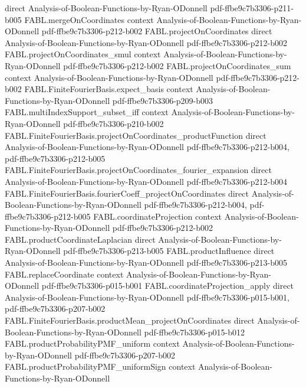 \begin{theorem}
  {direct}
  {Analysis-of-Boolean-Functions-by-Ryan-ODonnell}
  {pdf-ffbe9c7b3306-p211-b005}
\proofstep
  {FABL.mergeOnCoordinates}
  {context}
  {Analysis-of-Boolean-Functions-by-Ryan-ODonnell}
  {pdf-ffbe9c7b3306-p212-b002}
\proofstep
  {FABL.projectOnCoordinates}
  {direct}
  {Analysis-of-Boolean-Functions-by-Ryan-ODonnell}
  {pdf-ffbe9c7b3306-p212-b002}
\proofstep
  {FABL.projectOnCoordinates_smul}
  {context}
  {Analysis-of-Boolean-Functions-by-Ryan-ODonnell}
  {pdf-ffbe9c7b3306-p212-b002}
\proofstep
  {FABL.projectOnCoordinates_sum}
  {context}
  {Analysis-of-Boolean-Functions-by-Ryan-ODonnell}
  {pdf-ffbe9c7b3306-p212-b002}
\proofstep
  {FABL.FiniteFourierBasis.expect_basis}
  {context}
  {Analysis-of-Boolean-Functions-by-Ryan-ODonnell}
  {pdf-ffbe9c7b3306-p209-b003}
\proofstep
  {FABL.multiIndexSupport_subset_iff}
  {context}
  {Analysis-of-Boolean-Functions-by-Ryan-ODonnell}
  {pdf-ffbe9c7b3306-p210-b002}
\proofstep
  {FABL.FiniteFourierBasis.projectOnCoordinates_productFunction}
  {direct}
  {Analysis-of-Boolean-Functions-by-Ryan-ODonnell}
  {pdf-ffbe9c7b3306-p212-b004,
    pdf-ffbe9c7b3306-p212-b005}
\proofstep
  {FABL.FiniteFourierBasis.projectOnCoordinates_fourier_expansion}
  {direct}
  {Analysis-of-Boolean-Functions-by-Ryan-ODonnell}
  {pdf-ffbe9c7b3306-p212-b004}
\proofstep
  {FABL.FiniteFourierBasis.fourierCoeff_projectOnCoordinates}
  {direct}
  {Analysis-of-Boolean-Functions-by-Ryan-ODonnell}
  {pdf-ffbe9c7b3306-p212-b004,
    pdf-ffbe9c7b3306-p212-b005}
\proofstep
  {FABL.coordinateProjection}
  {context}
  {Analysis-of-Boolean-Functions-by-Ryan-ODonnell}
  {pdf-ffbe9c7b3306-p212-b002}
\proofstep
  {FABL.productCoordinateLaplacian}
  {direct}
  {Analysis-of-Boolean-Functions-by-Ryan-ODonnell}
  {pdf-ffbe9c7b3306-p213-b005}
\proofstep
  {FABL.productInfluence}
  {direct}
  {Analysis-of-Boolean-Functions-by-Ryan-ODonnell}
  {pdf-ffbe9c7b3306-p213-b005}
\proofstep
  {FABL.replaceCoordinate}
  {context}
  {Analysis-of-Boolean-Functions-by-Ryan-ODonnell}
  {pdf-ffbe9c7b3306-p015-b001}
\proofstep
  {FABL.coordinateProjection_apply}
  {direct}
  {Analysis-of-Boolean-Functions-by-Ryan-ODonnell}
  {pdf-ffbe9c7b3306-p015-b001,
    pdf-ffbe9c7b3306-p207-b002}
\proofstep
  {FABL.FiniteFourierBasis.productMean_projectOnCoordinates}
  {direct}
  {Analysis-of-Boolean-Functions-by-Ryan-ODonnell}
  {pdf-ffbe9c7b3306-p015-b012}
\proofstep
  {FABL.productProbabilityPMF_uniform}
  {context}
  {Analysis-of-Boolean-Functions-by-Ryan-ODonnell}
  {pdf-ffbe9c7b3306-p207-b002}
\proofstep
  {FABL.productProbabilityPMF_uniformSign}
  {context}
  {Analysis-of-Boolean-Functions-by-Ryan-ODonnell}

\end{theorem}
